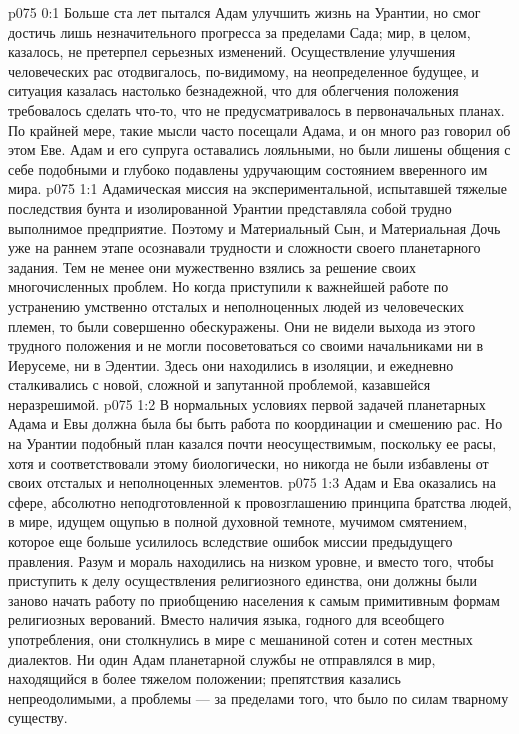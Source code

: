 \author{Солония}
\vs p075 0:1 Больше ста лет пытался Адам улучшить жизнь на Урантии, но смог достичь лишь незначительного прогресса за пределами Сада; мир, в целом, казалось, не претерпел серьезных изменений. Осуществление улучшения человеческих рас отодвигалось, по\hyp{}видимому, на неопределенное будущее, и ситуация казалась настолько безнадежной, что для облегчения положения требовалось сделать что\hyp{}то, что не предусматривалось в первоначальных планах. По крайней мере, такие мысли часто посещали Адама, и он много раз говорил об этом Еве. Адам и его супруга оставались лояльными, но были лишены общения с себе подобными и глубоко подавлены удручающим состоянием вверенного им мира.
\vs p075 1:1 Адамическая миссия на экспериментальной, испытавшей тяжелые последствия бунта и изолированной Урантии представляла собой трудно выполнимое предприятие. Поэтому и Материальный Сын, и Материальная Дочь уже на раннем этапе осознавали трудности и сложности своего планетарного задания. Тем не менее они мужественно взялись за решение своих многочисленных проблем. Но когда приступили к важнейшей работе по устранению умственно отсталых и неполноценных людей из человеческих племен, то были совершенно обескуражены. Они не видели выхода из этого трудного положения и не могли посоветоваться со своими начальниками ни в Иерусеме, ни в Эдентии. Здесь они находились в изоляции, и ежедневно сталкивались с новой, сложной и запутанной проблемой, казавшейся неразрешимой.
\vs p075 1:2 В нормальных условиях первой задачей планетарных Адама и Евы должна была бы быть работа по координации и смешению рас. Но на Урантии подобный план казался почти неосуществимым, поскольку ее расы, хотя и соответствовали этому биологически, но никогда не были избавлены от своих отсталых и неполноценных элементов.
\vs p075 1:3 Адам и Ева оказались на сфере, абсолютно неподготовленной к провозглашению принципа братства людей, в мире, идущем ощупью в полной духовной темноте, мучимом смятением, которое еще больше усилилось вследствие ошибок миссии предыдущего правления. Разум и мораль находились на низком уровне, и вместо того, чтобы приступить к делу осуществления религиозного единства, они должны были заново начать работу по приобщению населения к самым примитивным формам религиозных верований. Вместо наличия языка, годного для всеобщего употребления, они столкнулись в мире с мешаниной сотен и сотен местных диалектов. Ни один Адам планетарной службы не отправлялся в мир, находящийся в более тяжелом положении; препятствия казались непреодолимыми, а проблемы --- за пределами того, что было по силам тварному существу.
